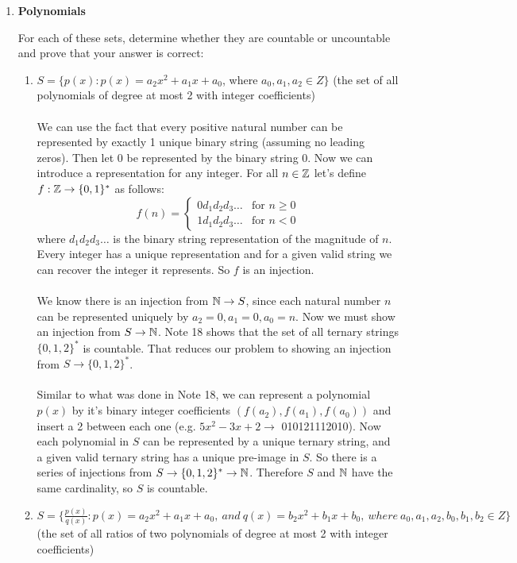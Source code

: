 \documentclass[11pt,fleqn]{article}
\begin{document}
\begin{enumerate}
\newpage
\item {\bf Polynomials}

For each of these sets, determine whether they are countable or uncountable and prove that your answer is correct:
\begin{enumerate}
\item $S = \{p(x) : p(x) = a_2 x^2 +a_1 x+a_0$, where $a_0,a_1,a_2 \in Z\}$ (the set of all polynomials of degree at most 2 with integer coefficients) \\\\
We can use the fact that every positive natural number can be represented by exactly 1 unique binary string (assuming no leading zeros). Then let $0$ be represented by the binary string $0$. Now we can introduce a representation for any integer. For all $n \in \mathbb{Z}$ let's define $f: \mathbb{Z} \rightarrow \{0,1\}^*$ as follows:
\[
 f(n) =
  \begin{cases}
   0d_1d_2d_3\ldots  & \text{for } n \geq 0 \\
   1d_1d_2d_3\ldots  & \text{for } n < 0
  \end{cases}
\]
where $d_1d_2d_3\ldots$ is the binary string representation of the magnitude of $n$. Every integer has a unique representation and for a given valid string we can recover the integer it represents. So $f$ is an injection. \\\\
We know there is an injection from $\mathbb{N} \rightarrow S$, since each natural number $n$ can be represented uniquely by $a_2=0,a_1=0,a_0=n$. Now we must show an injection from $S \rightarrow \mathbb{N}$. Note 18 shows that the set of all ternary strings $\{0,1,2\}^*$ is countable. That reduces our problem to showing an injection from $S \rightarrow \{0,1,2\}^*$. \\\\
Similar to what was done in Note 18, we can represent a polynomial $p(x)$ by it's binary integer coefficients $(f(a_2),f(a_1),f(a_0))$ and insert a 2 between each one (e.g. $5x^2 -3x + 2 \rightarrow$ 010121112010). Now each polynomial in $S$ can be represented by a unique ternary string, and a given valid ternary string has a unique pre-image in $S$. So there is a series of injections from $S \rightarrow \{0,1,2\}^* \rightarrow \mathbb{N}$. Therefore $S$ and $\mathbb{N}$ have the same cardinality, so $S$ is countable.
\item $S = \{\frac{p(x)}{q(x)} : p(x) = a_2 x^2 +a_1 x+a_0, ~and~ q(x) = b_2 x^2 +b_1 x+b_0, ~where ~a_0, a_1, a_2, b_0, b_1, b_2 \in Z\}$ (the set of all ratios of two polynomials of degree at most 2 with integer coefficients) \\\\

\end{enumerate}
\end{enumerate}
\end{document}
